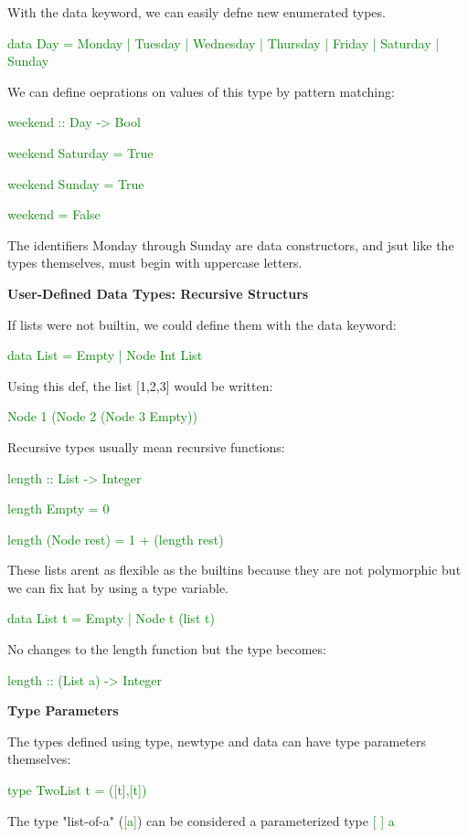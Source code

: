 \documentclass{article}
\begin{document}
With the data keyword, we can easily defne new enumerated types.

\textcolor{green}{data Day = Monday | Tuesday | Wednesday | Thursday | Friday | Saturday | Sunday}

We can define oeprations on values of this type by pattern matching:

\textcolor{green}{weekend  ::  Day -> Bool}

\textcolor{green}{weekend  Saturday = True}

\textcolor{green}{weekend Sunday  = True}

\textcolor{green}{weekend \textunderscore = False}

The identifiers Monday through Sunday are data constructors, and jsut like the types themselves, must begin with uppercase letters.


\textbf{User-Defined Data Types: Recursive Structurs}

If lists were not builtin, we could define them with the data keyword:

\textcolor{green}{data List = Empty}
\textcolor{green}{|  Node Int List}

Using this def, the list [1,2,3] would be written:

\textcolor{green}{Node  1  (Node  2  (Node  3  Empty))}

Recursive types usually mean recursive functions:

\textcolor{green}{length  ::  List -> Integer}

\textcolor{green}{length  Empty = 0}

\textcolor{green}{length  (Node  \textunderscore  rest) = 1 + (length  rest)}


These lists arent as flexible as the builtins because they are not polymorphic but we can fix hat by using a type variable.

\textcolor{green}{data List t = Empty}
\textcolor{green}{ | Node t (list t)}

No changes to the length function but the type becomes:

\textcolor{green}{length  ::  (List  a) -> Integer}


\textbf{Type Parameters}

The types defined using type, newtype and data can have type parameters themselves:

\textcolor{green}{type TwoList  t = ([t],[t])}

The type "list-of-a" (\textcolor{green}{[a]}) can be considered a parameterized type \textcolor{green}{ [ ]  a}
\end{document}

